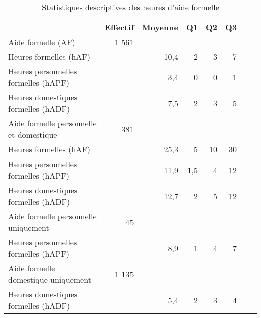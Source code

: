 \begin{Article}
\begin{refsection}[Bonnal]
\begin{table}[]
\centering
\caption{Statistiques descriptives des heures d'aide formelle}
\label{stat_des_heures_care}
\begin{threeparttable}[t]
\begin{tabularx}{\linewidth}{@{}X rrrrrrr@{}}
	\toprule
	& Effectif & Moyenne & Q1 & Q2 & Q3 \\\midrule
	Aide formelle (AF) & 1 561 & & & & \\
	Heures formelles (hAF) & & 10,4 & 2 & 3 & 7 \\
	Heures personnelles formelles (hAPF) & & 3,4 & 0 & 0 & 1 \\
	Heures domestiques formelles (hADF) & & 7,5 & 2 & 3 & 5 \\\midrule
	Aide formelle personnelle et domestique & 381 & & & & \\
	Heures formelles (hAF) & & 25,3 & 5 & 10 & 30 \\
	Heures personnelles formelles (hAPF) & & 11,9 & 1,5 & 4 & 12 \\
	Heures domestiques formelles (hADF) & & 12,7 & 2 & 5 & 12 \\ \midrule
	Aide formelle personnelle uniquement & 45 & & & & \\
	Heures personnelles formelles (hAPF) & & 8,9 & 1 & 4 & 7 \\\midrule
	Aide formelle domestique uniquement & 1 135 & & & & \\
	Heures domestiques formelles (hADF) & & 5,4 & 2 & 3 & 4 \\\midrule
\end{tabularx}
\end{threeparttable}
\end{table}


\end{refsection}
\end{Article}
